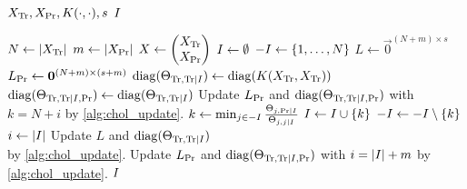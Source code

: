 \begin{algorithmic}[1]
  \REQUIRE \( X_{\text{Tr}}, X_{\text{Pr}}, K(\cdot, \cdot), s \)
  \ENSURE \( I \)

  \STATE \( N \gets \lvert X_{\text{Tr}}\rvert \)
  \STATE \( m \gets \lvert X_{\text{Pr}}\rvert \)
  \STATE \(
    X \gets
    \begin{pmatrix}
      X_{\text{Tr}} \\
      X_{\text{Pr}}
    \end{pmatrix}
  \)
  \STATE \( I \gets \emptyset \)
  \STATE \( -I \gets \{ 1, \dotsc, N \} \)
  \STATE \( L \gets \vec{0}^{(N + m) \times s} \)
  \STATE \( L_{\text{Pr}} \gets \bm{0}^{(N + m) \times (s + m)} \)
  \STATE \(
    \operatorname{diag}(\Theta_{\text{Tr}, \text{Tr} \mid I}) \gets
    \operatorname{diag}(K(X_{\text{Tr}}, X_{\text{Tr}}))
  \)
  \STATE \(
    \operatorname{diag}(\Theta_{\text{Tr}, \text{Tr} \mid I, \text{Pr}}) \gets
    \operatorname{diag}(\Theta_{\text{Tr}, \text{Tr} \mid I})
  \)
    \STATE Update \( L_{\text{Pr}} \) and \( \operatorname{diag}(\Theta_{\text{Tr}, \text{Tr}
      \mid I, \text{Pr}}) \) with \( k = N + i \) by \cref{alg:chol_update}.
  \ENDFOR
    \STATE \(
      k \gets \min_{j \in -I}
      \frac{\Theta_{j, \text{Pr} \mid I}}{\Theta_{j, j \mid I}}
    \)
    \STATE \( I \gets I \cup \{ k \} \)
    \STATE \( -I \gets -I \setminus \{ k \} \)
    \STATE \( i \gets \lvert I\rvert \)
    \STATE Update \( L \) and \( \operatorname{diag}(\Theta_{\text{Tr}, \text{Tr}
      \mid I}) \) \\ by \cref{alg:chol_update}.
    \STATE Update \( L_{\text{Pr}} \) and \( \operatorname{diag}(\Theta_{\text{Tr}, \text{Tr} \mid I,
      \text{Pr}}) \) with \( i = \lvert I\rvert + m \) by \cref{alg:chol_update}.
  \ENDWHILE
  \RETURN \( I \)
\end{algorithmic}

